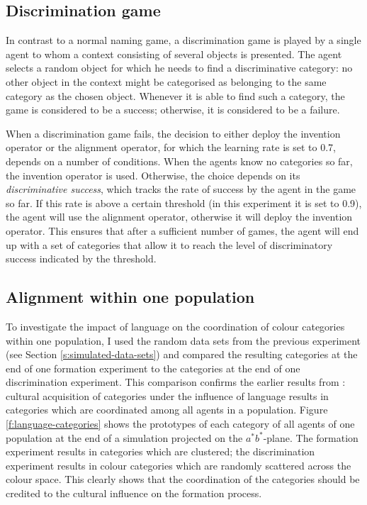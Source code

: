 \subsection{Discrimination game}

In contrast to a normal naming game, a discrimination game is played
by a single agent to whom a context consisting of several objects is
presented. The agent selects a random object for which he needs to
find a discriminative category: no other object in the context might
be categorised as belonging to the same category as the chosen
object. Whenever it is able to find such a category, the game is
considered to be a success; otherwise, it is considered to be a
failure.

When a discrimination game fails, the decision to either deploy the
invention operator or the alignment operator, for which the learning
rate is set to 0.7, depends on a number of conditions. When the agents
know no categories so far, the invention operator is used. Otherwise,
the choice depends on its \emph{discriminative success}, which tracks
the rate of success by the agent in the game so far. If this rate is
above a certain threshold (in this experiment it is set to 0.9), the
agent will use the alignment operator, otherwise it will deploy the
invention operator. This ensures that after a sufficient number of
games, the agent will end up with a set of categories that allow it to
reach the level of discriminatory success indicated by the threshold.

\subsection{Alignment within one population}

To investigate the impact of language on the coordination of colour
categories within one population, I used the random data sets from the
previous experiment (see Section \ref{s:simulated-data-sets}) and
compared the resulting categories at the end of one formation
experiment to the categories at the end of one discrimination
experiment. This comparison confirms the earlier results from
\cite{steels05coordinating}: cultural acquisition of categories under
the influence of language results in categories which are coordinated
among all agents in a population. Figure \ref{f:language-categories}
shows the prototypes of each category of all agents of one population
at the end of a simulation projected on the $a^*b^*$-plane. The
formation experiment results in categories which are clustered; the
discrimination experiment results in colour categories which are
randomly scattered across the colour space. This clearly shows that
the coordination of the categories should be credited to the cultural
influence on the formation process.

